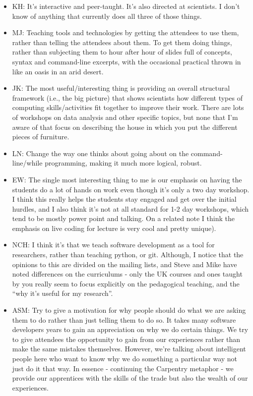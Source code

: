 \documentclass{article}
\begin{document}
\begin{itemize}

  \item KH: It's interactive and peer-taught. It's also directed at
    scientists. I don't know of anything that currently does all three
    of those things.

  \item MJ: Teaching tools and technologies by getting the attendees
    to use them, rather than telling the attendees about them. To get
    them doing things, rather than subjecting them to hour after hour
    of slides full of concepts, syntax and command-line excerpts, with
    the occasional practical thrown in like an oasis in an arid
    desert.

  \item JK: The most useful/interesting thing is providing an overall
    structural framework (i.e., the big picture) that shows scientists
    how different types of computing skills/activities fit together to
    improve their work. There are lots of workshops on data analysis
    and other specific topics, but none that I'm aware of that focus
    on describing the house in which you put the different pieces of
    furniture.

  \item LN: Change the way one thinks about going about on the
    command-line/while programming, making it much more logical,
    robust.

  \item EW: The single most interesting thing to me is our emphasis on
    having the students do a lot of hands on work even though it's
    only a two day workshop. I think this really helps the students
    stay engaged and get over the initial hurdles, and I also think
    it's not at all standard for 1-2 day workshops, which tend to be
    mostly power point and talking. On a related note I think the
    emphasis on live coding for lecture is very cool and pretty
    unique).

  \item NCH: I think it's that we teach software development as a tool
    for researchers, rather than teaching python, or git. Although, I
    notice that the opinions to this are divided on the mailing lists,
    and Steve and Mike have noted differences on the curriculums -
    only the UK courses and ones taught by you really seem to focus
    explicitly on the pedagogical teaching, and the ``why it's useful
    for my research''.

  \item ASM: Try to give a motivation for why people should do what we
    are asking them to do rather than just telling them to do so. It
    takes many software developers years to gain an appreciation on
    why we do certain things. We try to give attendees the opportunity
    to gain from our experiences rather than make the same mistakes
    themselves. However, we're talking about intelligent people here
    who want to know why we do something a particular way not just do
    it that way. In essence - continuing the Carpentry metaphor - we
    provide our apprentices with the skills of the trade but also the
    wealth of our experiences.



\end{itemize}
\end{document}
